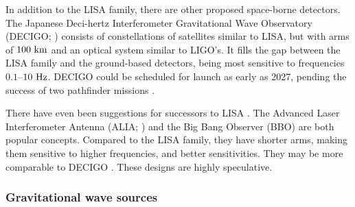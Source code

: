 In addition to the LISA family, there are other proposed space-borne detectors. The Japanese Deci-hertz Interferometer Gravitational Wave Observatory (DECIGO; \citealt{Kawamura2006,Kawamura2011}) consists of constellations of satellites similar to LISA, but with arms of $100~\mathrm{km}$ and an optical system similar to LIGO's. It fills the gap between the LISA family and the ground-based detectors, being most sensitive to frequencies $0.1$--$10~\mathrm{Hz}$. DECIGO could be scheduled for launch as early as 2027, pending the success of two pathfinder missions \citep{Ando2010}.

There have even been suggestions for successors to LISA \citep{Crowder2005}. The Advanced Laser Interferometer Antenna (ALIA; \citealt{Bender2013}) and the Big Bang Observer (BBO) are both popular concepts. Compared to the LISA family, they have shorter arms, making them sensitive to higher frequencies, and better sensitivities. They may be more comparable to DECIGO \citep{Yagi2011a}. These designs are highly speculative.

\subsubsection{Gravitational wave sources}\label{sec:GW-sources}

